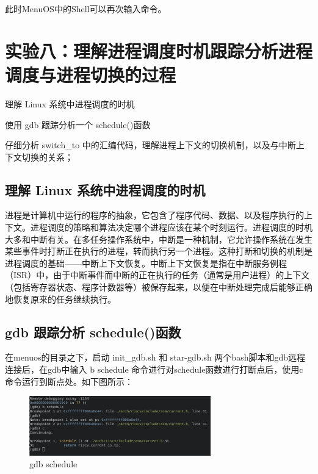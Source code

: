 \documentclass[lang=cn,10pt]{elegantbook}
\begin{document}
此时MenuOS中的Shell可以再次输入命令。

\chapter{实验八：理解进程调度时机跟踪分析进程调度与进程切换的过程}
\begin{introduction}[实验要求]
\item 理解 Linux 系统中进程调度的时机
\item 使用 gdb 跟踪分析一个 schedule()函数
\item 仔细分析 switch\_to 中的汇编代码，理解进程上下文的切换机制，以及与中断上下文切换的关系；
\end{introduction}

\section{理解 Linux 系统中进程调度的时机}
进程是计算机中运行的程序的抽象，它包含了程序代码、数据、以及程序执行的上下文。进程调度的策略和算法决定哪个进程应该在某个时刻运行。进程调度的时机大多和中断有关。在多任务操作系统中，中断是一种机制，它允许操作系统在发生某些事件时打断正在执行的进程，转而执行另一个进程。这种打断和切换的机制是进程调度的基础——中断上下文恢复。中断上下文恢复是指在中断服务例程（ISR）中，由于中断事件而中断的正在执行的任务（通常是用户进程）的上下文（包括寄存器状态、程序计数器等）被保存起来，以便在中断处理完成后能够正确地恢复原来的任务继续执行。

\section{gdb 跟踪分析 schedule()函数}
在menuos的目录之下，启动 init\_gdb.sh 和 star-gdb.sh 两个bash脚本和gdb远程连接后，在gdb中输入 b schedule 命令进行对schedule函数进行打断点后，使用c 命令运行到断点处。如下图所示：
\begin{figure}[htbp]
  \centering
  \includegraphics[width=0.7\textwidth]{image/image-20231109201036323.png}
  \caption{gdb schedule}
\end{figure}
\end{document}
